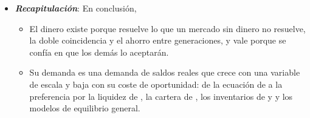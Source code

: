\documentclass[11pt]{article}
\begin{document}
\begin{itemize}
\item \textbf{\emph{Recapitulación}}: En conclusión,
  \begin{itemize}
  \item El dinero existe porque resuelve lo que un mercado sin dinero no resuelve, la doble coincidencia y el ahorro entre generaciones, y vale porque se confía en que los demás lo aceptarán.

  \item Su demanda es una demanda de saldos reales que crece con una variable de escala y baja con su coste de oportunidad: de la ecuación de  a la preferencia por la liquidez de , la cartera de , los inventarios de  y  y los modelos de equilibrio general.


\end{itemize}
\end{itemize}
\end{document}
